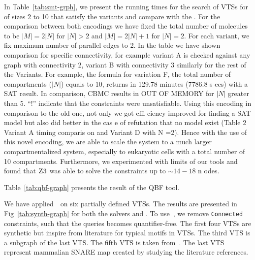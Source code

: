 

In Table~\ref{tab:smt-grph}, we present the running times for the search of
VTSs for {\smttool} of sizes 2 to 10 that satisfy the variants and compare with the {\sattool}.
%
For the comparison between both encodings we have fixed the total
number of molecules to be $|M| = 2|N|$ for $ |N|> 2$ and $|M| = 2|N| + 1$ for $|N| = 2$.
%
For each variant, we fix maximum number of parallel
edges to 2.
%
In the table we have shown comparison for specific connectivity, for
example variant A is checked against any graph with connectivity 2,
variant B with connectivity 3 similarly for the rest of the Variants.
%
%
For example, the formula for variation F, the total number of
compartments ($|N|$) equals to 10, returns in 129.78 minutes (7786.8 s
ecs)
with a SAT result.
%
In comparison, CBMC results in OUT OF MEMORY for $|N|$ greater than 5.
%
``!'' indicate that the constraints were unsatisfiable.
%
Using this encoding in comparison to the old one, not only we got effi
ciency improved for finding a SAT model but also did better in the cas
e of refutation that no model exist (Table 2 Variant A timing comparis
on and Variant D with N =2). 
%
Hence with the use of this novel encoding, we are able to scale the system to a much larger compartmentalized system, especially to
eukaryotic cells with a total number of 10 compartments.
%
Furthermore, we experimented with limits of our tools and found
that $\textsc{Z3}$ was able to solve the constraints up to $\sim{14-18}$ n
odes.


Table~\ref{tab:qbf-graph} presents the result of the QBF tool.


We have applied~\ourtool~on six partially defined VTSs.
%
The results are presented in Fig~\ref{tab:synth-graph} for both the solvers
\depqbf and \zthree.
%
To use~\zthree, we remove \texttt{Connected} constraints, such that the queries becomes
quantifier-free.
%
%
%
The first four VTSs are synthetic but inspire from literature for
typical motifs in VTSs. 
The third VTS is a subgraph of the last VTS.
%
%
The fifth VTS is taken from~\cite{burri2004complete}.
%
The last VTS represent mammalian SNARE map created by studying the literature references.  

